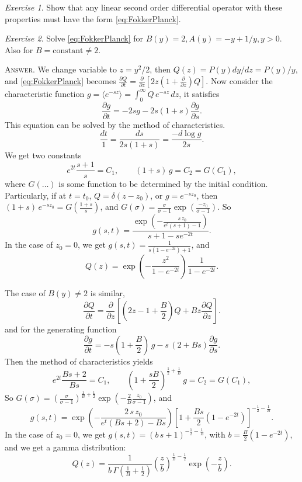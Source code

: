 \documentclass{book}
\numberwithin{equation}{section}
\theoremstyle{plain}
\theoremstyle{definition}
\theoremstyle{remark}
\theoremstyle{BoldStyle}
\newtheorem{exercise}{Exercise}
\numberwithin{exercise}{section}
\newcommand{\answer}[1]{{\color{DarkBlue}\footnotesize \textsc{Answer.} #1}}
\begin{document}
\begin{exercise}
  Show that any linear second order differential operator
  with these properties must have the form \eqref{eq:FokkerPlanck}.
\end{exercise}

\begin{exercise}
  Solve \eqref{eq:FokkerPlanck} for $B(y) = 2, A(y) = -y + 1/y, y > 0$.
  Also for $B = \mathrm{constant} \ne 2$.

  \answer{We change variable to $z = y^2/2$,
    then $Q(z) = P(y) dy/dz = P(y)/y$, and \eqref{eq:FokkerPlanck}
    becomes
    $\frac{ \partial Q } { \partial t}
    = \frac{ \partial } { \partial z }
    \left[ 2 z \left(1 + \frac{ \partial } { \partial z } \right) Q \right].$
    Now consider the characteristic function
    $g = \langle e^{-sz} \rangle = \int_0^\infty Q \, e^{-sz} \, dz$,
    it satisfies
    $$
    \frac{ \partial g }{ \partial t } = -2sg -2s(1+s) \frac{ \partial g }{ \partial s}.
    $$
    This equation can be solved by the method of characteristics.
    $$
    \frac{dt}{1} = \frac{ds}{2s(1+s)}  = \frac{-d\log g} { 2s }.
    $$
    We get two constants
    $$
    e^{2t} \frac{s + 1}{s} = C_1,
    \qquad
    (1+s) \, g = C_2 = G(C_1),
    $$
    where $G(\dots)$ is some function to be determined by the initial condition.
    Particularly, if at $t = t_0$, $Q = \delta(z - z_0)$, or $g = e^{-s z_0}$,
    then $(1+s)\, e^{-sz_0} = G\left(\frac{1+s}{s}\right)$, and
    $G(\sigma) = \frac{\sigma}{\sigma-1} \exp\left(\frac{-z_0}{\sigma - 1}\right)$.
    So
    $$
    g(s, t) = \frac{\exp\left( - \frac{ s \, z_0 } { e^t(s+1) - 1} \right) }
    {s + 1 - s e^{-2t}}.
    $$
    In the case of $z_0 = 0$, we get $g(s, t) = \frac{1}{s(1-e^{-2t}) + 1}$,
    and
    $$Q(z) = \exp\left(-\frac{z^2}{1-e^{-2t}}\right)\frac{1}{1 - e^{-2t}}.$$

    The case of $B(y) \ne 2$ is similar,
    $$
    \frac{ \partial Q } { \partial t}
    = \frac{ \partial } { \partial z }
    \left[ \left(2 z - 1 + \frac B 2 \right) Q
    + B z \frac{ \partial Q } { \partial z } \right].
    $$
    and for the generating function
    $$
      \frac{ \partial g }{ \partial t } = -s\left(1+ \frac B 2 \right) \, g
      -s \, (2+Bs) \frac{ \partial g }{ \partial s}.
    $$
    Then the method of characteristics yields
    $$
    e^{2t} \frac{Bs + 2}{Bs} = C_1,
    \qquad
    \left(1+\frac{sB}{2}\right)^{\frac{1}{2} + \frac{1}{B}} \, g = C_2 = G(C_1),
    $$
    So
    $G(\sigma) = \left( \frac{\sigma}{\sigma-1} \right)^{\frac{1}{B} + \frac{1}{2}}
    \exp\left(-\frac{2}{B}\frac{z_0}{\sigma - 1}\right)$, and
    $$
    g(s, t) = \exp\left( - \frac{ 2 \, s \, z_0 } { e^t(Bs+2) - Bs} \right)
    \left[1 + \frac{Bs}{2}\left(1 - e^{-2t}\right) \right]^{-\frac{1}{2} -\frac{1}{B}}.
    $$
    In the case of $z_0 = 0$, we get $g(s, t) = (b \, s + 1)^{-\frac{1}{2} -\frac{1}{B}}$,
    with $b = \frac{B}{2}(1 - e^{-2t})$,
    and we get a gamma distribution:
    $$
    Q(z) =
    \frac{1}{b \, \Gamma\left(\frac{1}{B}+\frac{1}{2}\right)}
    \left(\frac z b\right)^{\frac 1 B- \frac 1 2}
    \exp\left( - \frac z b \right).
    $$
  }
\end{exercise}
\end{document}
